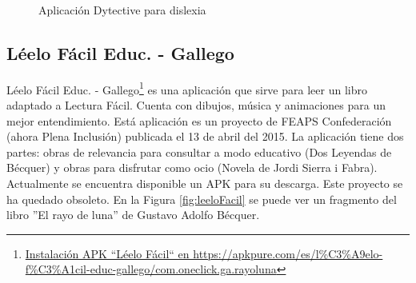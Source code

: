 \begin{figure}[h]
	\centering

	\caption{Aplicación Dytective para dislexia}
	\label{fig:dytective}
\end{figure}

\subsection{Léelo Fácil Educ. - Gallego }
Léelo Fácil Educ. - Gallego\footnote{\href{https://apkpure.com/es/l\%C3\%A9elo-f\%C3\%A1cil-educ-gallego/com.oneclick.ga.rayoluna}{Instalación APK ``Léelo Fácil`` en https://apkpure.com/es/l\%C3\%A9elo-f\%C3\%A1cil-educ-gallego/com.oneclick.ga.rayoluna}} es una aplicación que sirve para leer un libro adaptado a Lectura Fácil. Cuenta con dibujos, música y animaciones para un mejor entendimiento. Está aplicación es un proyecto de FEAPS Confederación (ahora Plena Inclusión) publicada el 13 de abril del 2015. La aplicación tiene dos partes: obras de relevancia para consultar a modo educativo (Dos Leyendas de Bécquer) y obras para disfrutar como ocio (Novela de Jordi Sierra i Fabra). Actualmente se encuentra disponible un APK para su descarga. Este proyecto se ha quedado obsoleto. En la Figura \ref{fig:leeloFacil} se puede ver un fragmento del libro ''El rayo de luna'' de Gustavo Adolfo Bécquer.

